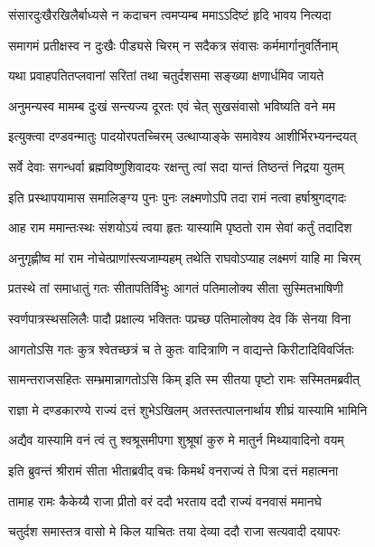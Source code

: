 \twolineshloka
{संसारदुःखैरखिलैर्बाध्यसे न कदाचन}
{त्वमप्यम्ब ममाऽऽदिष्टं हृदि भावय नित्यदा} %

\twolineshloka
{समागमं प्रतीक्षस्व न दुःखैः पीड्यसे चिरम्}
{न सदैकत्र संवासः कर्ममार्गानुवर्तिनाम्} %

\twolineshloka
{यथा प्रवाहपतितप्लवानां सरितां तथा}
{चतुर्दशसमा सङ्ख्या क्षणार्धमिव जायते} %

\twolineshloka
{अनुमन्यस्व मामम्ब दुःखं सन्त्यज्य दूरतः}
{एवं चेत् सुखसंवासो भविष्यति वने मम} %

\twolineshloka
{इत्युक्त्वा दण्डवन्मातुः पादयोरपतच्चिरम्}
{उत्थाप्याङ्के समावेश्य आशीर्भिरभ्यनन्दयत्} %

\twolineshloka
{सर्वे देवाः सगन्धर्वा ब्रह्मविष्णुशिवादयः}
{रक्षन्तु त्वां सदा यान्तं तिष्ठन्तं निद्रया युतम्} %

\twolineshloka
{इति प्रस्थापयामास समालिङ्ग्य पुनः पुनः}
{लक्ष्मणोऽपि तदा रामं नत्वा हर्षाश्रुगद्गदः} %

\twolineshloka
{आह राम ममान्तःस्थः संशयोऽयं त्वया हृतः}
{यास्यामि पृष्ठतो राम सेवां कर्तुं तदादिश} %

\twolineshloka
{अनुगृह्णीष्व मां राम नोचेत्प्राणांस्त्यजाम्यहम्}
{तथेति राघवोऽप्याह लक्ष्मणं याहि मा चिरम्} %

\twolineshloka
{प्रतस्थे तां समाधातुं गतः सीतापतिर्विभुः}
{आगतं पतिमालोक्य सीता सुस्मितभाषिणी} %

\twolineshloka
{स्वर्णपात्रस्थसलिलैः पादौ प्रक्षाल्य भक्तितः}
{पप्रच्छ पतिमालोक्य देव किं सेनया विना} %

\twolineshloka
{आगतोऽसि गतः कुत्र श्वेतच्छत्रं च ते कुतः}
{वादित्राणि न वाद्यन्ते किरीटादिविवर्जितः} %

\twolineshloka
{सामन्तराजसहितः सम्भ्रमान्नागतोऽसि किम्}
{इति स्म सीतया पृष्टो रामः सस्मितमब्रवीत्} %

\twolineshloka
{राज्ञा मे दण्डकारण्ये राज्यं दत्तं शुभेऽखिलम्}
{अतस्तत्पालनार्थाय शीघ्रं यास्यामि भामिनि} %

\twolineshloka
{अद्यैव यास्यामि वनं त्वं तु श्वश्रूसमीपगा}
{शुश्रूषां कुरु मे मातुर्न मिथ्यावादिनो वयम्} %

\twolineshloka
{इति ब्रुवन्तं श्रीरामं सीता भीताब्रवीद् वचः}
{किमर्थं वनराज्यं ते पित्रा दत्तं महात्मना} %

\twolineshloka
{तामाह रामः कैकेय्यै राजा प्रीतो वरं ददौ}
{भरताय ददौ राज्यं वनवासं ममानघे} %

\twolineshloka
{चतुर्दश समास्तत्र वासो मे किल याचितः}
{तया देव्या ददौ राजा सत्यवादी दयापरः} %

